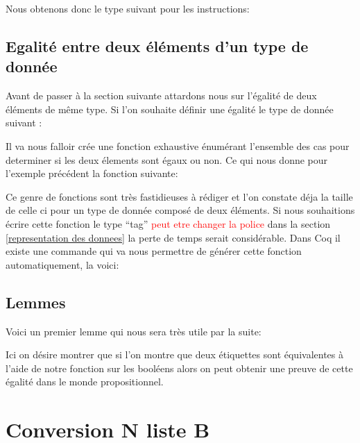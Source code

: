 \documentclass {article}
\newcommand{\codefrom}[3]
           {}
\theoremstyle{definition}
\theoremstyle{remark}
\newcommand{\todo}[1]{\textcolor{red}{#1}}
\begin{document}
Nous obtenons donc le type suivant pour les instructions:
\codefrom{src}{ast_instructions}{instruction}






\subsection{Egalité entre deux éléments d'un type de donnée}
Avant de passer à la section suivante attardons nous sur l'égalité de deux éléments de même type.
Si l'on souhaite définir une égalité le type de donnée suivant :
\codefrom{rapport}{definitions}{example_type}

Il va nous falloir crée une fonction exhaustive énumérant l'ensemble des cas pour determiner
si les deux élements sont égaux ou non. Ce qui nous donne pour l'exemple précédent la fonction suivante:

\codefrom{rapport}{definitions}{equal}

Ce genre de fonctions sont très fastidieuses à rédiger et l'on constate déja la taille de celle ci
pour un type de donnée composé de deux éléments.
Si nous souhaitions écrire cette fonction le type ``tag'' \todo{peut etre changer la police} dans
la section \ref{representation des donnees} la perte de temps serait considérable.
Dans Coq il existe une commande qui va nous permettre de générer cette fonction
automatiquement, la voici:

\codefrom{rapport}{definitions}{SchemeEqual}



\subsection{Lemmes}
Voici un premier lemme qui nous sera très utile par la suite:
\codefrom{src}{ast_instructions}{tag_beq_different}
Ici on désire montrer que si l'on montre que deux étiquettes sont équivalentes
à l'aide de notre fonction sur les booléens alors on peut obtenir une preuve
de cette égalité dans le monde propositionnel.









\section{Conversion N liste B}
\end{document}
